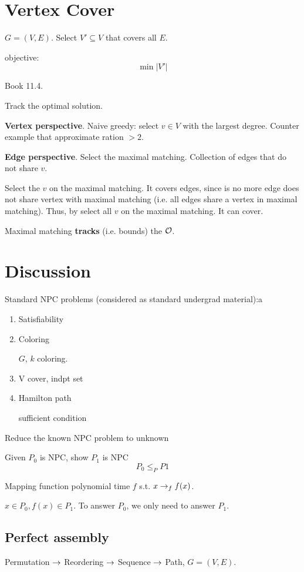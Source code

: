 \documentclass[a4paper]{report}
\theoremstyle{definition}
\begin{document}
\section{Vertex Cover}
$G=(V, E)$. Select $V'\subseteq V$ that covers all $E$.

objective:
$$\min |V'|$$

Book 11.4.

Track the optimal solution.

\textbf{Vertex perspective}. Naive greedy: select $v\in V$ with the largest degree. Counter example that approximate ration $>2$.

\textbf{Edge perspective}. Select the maximal matching. Collection of edges that do not share $v$.

Select the $v$ on the maximal matching. It covers edges, since is no more edge does not share vertex with maximal matching (i.e. all edges share a vertex in maximal matching). Thus, by select all $v$ on the maximal matching. It can cover.

Maximal matching \textbf{tracks} (i.e. bounds) the $\mathcal{O}$.


\section{Discussion}
Standard NPC problems (considered as standard undergrad material):a
\begin{enumerate}
\item Satisfiability 
\item Coloring

$G$, $k$ coloring.

\item V cover, indpt set 
\item Hamilton path 

sufficient condition
\end{enumerate}

Reduce the known NPC problem to unknown 


Given $P_0$ is NPC, show $P_1$ is NPC
$$
P_0 \leq_P P1
$$

Mapping function polynomial time $f$ s.t. $x \rightarrow_f f(x)$. 

$x\in P_0, f(x) \in P_1$. To answer $P_0$, we only need to answer $P_1$. 



\subsection*{Perfect assembly}
Permutation $\rightarrow$ Reordering $\rightarrow$ Sequence $\rightarrow$ Path, $G=(V, E)$. 
\end{document}
